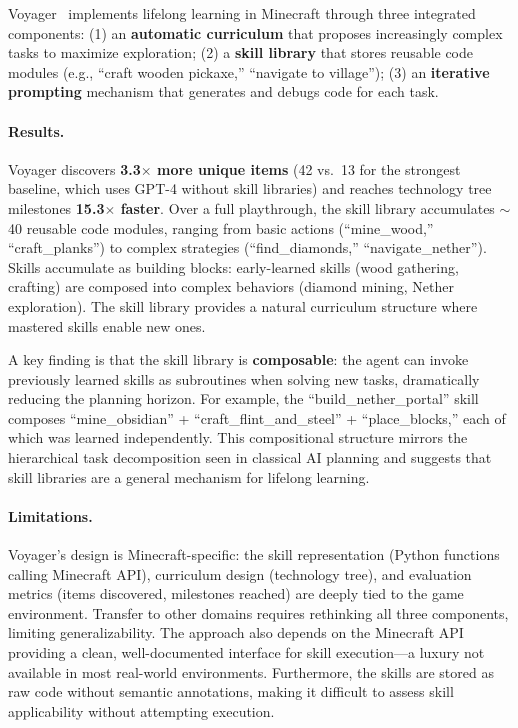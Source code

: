 Voyager~\citep{voyager2023} implements lifelong learning in Minecraft through three integrated components: (1) an \textbf{automatic curriculum} that proposes increasingly complex tasks to maximize exploration; (2) a \textbf{skill library} that stores reusable code modules (e.g., ``craft wooden pickaxe,'' ``navigate to village''); (3) an \textbf{iterative prompting} mechanism that generates and debugs code for each task.

\paragraph{Results.}
Voyager discovers \textbf{3.3$\times$ more unique items} (42 vs.\ 13 for the strongest baseline, which uses GPT-4 without skill libraries) and reaches technology tree milestones \textbf{15.3$\times$ faster}. Over a full playthrough, the skill library accumulates $\sim$40 reusable code modules, ranging from basic actions (``mine\_wood,'' ``craft\_planks'') to complex strategies (``find\_diamonds,'' ``navigate\_nether''). Skills accumulate as building blocks: early-learned skills (wood gathering, crafting) are composed into complex behaviors (diamond mining, Nether exploration). The skill library provides a natural curriculum structure where mastered skills enable new ones.

A key finding is that the skill library is \textbf{composable}: the agent can invoke previously learned skills as subroutines when solving new tasks, dramatically reducing the planning horizon. For example, the ``build\_nether\_portal'' skill composes ``mine\_obsidian'' + ``craft\_flint\_and\_steel'' + ``place\_blocks,'' each of which was learned independently. This compositional structure mirrors the hierarchical task decomposition seen in classical AI planning and suggests that skill libraries are a general mechanism for lifelong learning.

\paragraph{Limitations.}
Voyager's design is Minecraft-specific: the skill representation (Python functions calling Minecraft API), curriculum design (technology tree), and evaluation metrics (items discovered, milestones reached) are deeply tied to the game environment. Transfer to other domains requires rethinking all three components, limiting generalizability. The approach also depends on the Minecraft API providing a clean, well-documented interface for skill execution---a luxury not available in most real-world environments. Furthermore, the skills are stored as raw code without semantic annotations, making it difficult to assess skill applicability without attempting execution.


